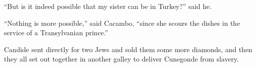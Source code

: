 ``But is it indeed possible that my sister can be in Turkey?'' said he.

``Nothing is more possible,'' said Cacambo, ``since she scours the dishes in the service of a Transylvanian prince.''

Candide sent directly for two Jews and sold them some more diamonds, and then they all set out together in another galley to deliver Cunegonde from slavery.

